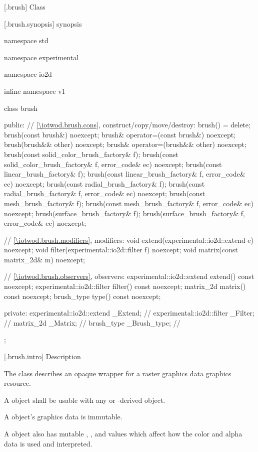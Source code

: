  [\iotwod.brush] {Class }

 [\iotwod.brush.synopsis] { synopsis}

\begin{codeblock}
namespace std { namespace experimental { namespace io2d { inline namespace v1 {
  class brush {
  public:
    // \ref{\iotwod.brush.cons}, construct/copy/move/destroy:
    brush() = delete;
    brush(const brush&) noexcept;
    brush& operator=(const brush&) noexcept;
    brush(brush&& other) noexcept;
    brush& operator=(brush&& other) noexcept;
    brush(const solid_color_brush_factory& f);
    brush(const solid_color_brush_factory& f, error_code& ec) noexcept;
    brush(const linear_brush_factory& f);
    brush(const linear_brush_factory& f, error_code& ec) noexcept;
    brush(const radial_brush_factory& f);
    brush(const radial_brush_factory& f, error_code& ec) noexcept;
    brush(const mesh_brush_factory& f);
    brush(const mesh_brush_factory& f, error_code& ec) noexcept;
    brush(surface_brush_factory& f);
    brush(surface_brush_factory& f, error_code& ec) noexcept;

    // \ref{\iotwod.brush.modifiers}, modifiers:
    void extend(experimental::io2d::extend e) noexcept;
    void filter(experimental::io2d::filter f) noexcept;
    void matrix(const matrix_2d& m) noexcept;

    // \ref{\iotwod.brush.observers}, observers:
    experimental::io2d::extend extend() const noexcept;
    experimental::io2d::filter filter() const noexcept;
    matrix_2d matrix() const noexcept;
    brush_type type() const noexcept;

  private:
    experimental::io2d::extend _Extend; // \expos
    experimental::io2d::filter _Filter; // \expos
    matrix_2d _Matrix;                         // \expos
    brush_type _Brush_type;                    // \expos
  };
} } } }
\end{codeblock}

 [\iotwod.brush.intro] { Description}

\pnum
{}
The class  describes an opaque wrapper for a raster graphics data graphics resource.

\pnum
A  object shall be usable with any  or -derived object.

\pnum
A  object's graphics data is immutable.

\pnum
A  object also has mutable , , and  values which affect how the color and alpha data is used and interpreted.

